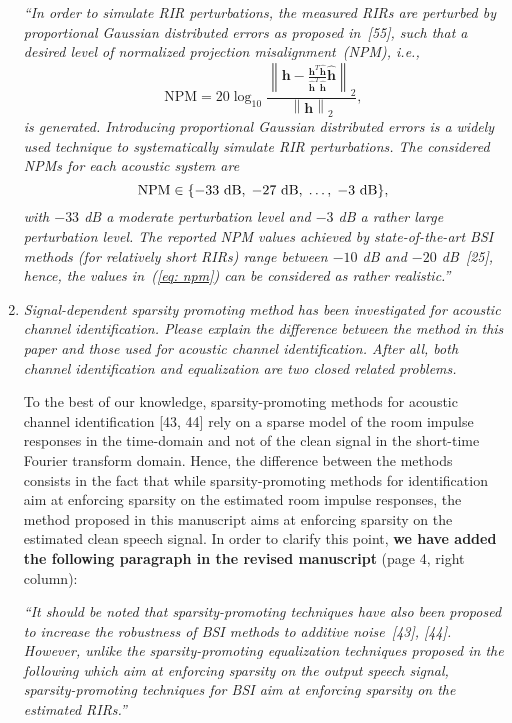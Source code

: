 \documentclass[9pt, a4paper]{article}
\begin{document}
\begin{enumerate}
{\textit{``In order to simulate RIR perturbations, the measured RIRs are perturbed by proportional Gaussian distributed errors as proposed in~[55], such that a desired level of normalized projection misalignment~(NPM), i.e.,
\begin{equation}
{\text{NPM}} = 20 \log_{10} \frac{ \left\| \mathbf{h} - \frac{\mathbf{h}^T\hat{\mathbf{h}}}{\hat{\mathbf{h}}^T\hat{\mathbf{h}}}\hat{\mathbf{h}}\right\|_2}{\left\| \mathbf{h} \right\|_2},
\end{equation}
is generated.
Introducing proportional Gaussian distributed errors is a widely used technique to systematically simulate RIR perturbations.
The considered NPMs for each acoustic system are
\begin{equation}
\label{eq: npm}
{\text{NPM}} \in \{ -33~{\rm dB}, \; -27~{\rm dB}, \; \ldots, \; -3~{\rm dB} \},
\end{equation}
with $-33$ dB a moderate perturbation level and $-3$ dB a rather large perturbation level.
The reported NPM values achieved by state-of-the-art BSI methods (for relatively short RIRs) range between $-10$ dB and $-20$ dB~[25], hence, the values in~(\ref{eq: npm}) can be considered as rather realistic.''
}}

\newpage

\item {\it{ Signal-dependent sparsity promoting method has been investigated for acoustic channel identification. Please explain the difference between the method in this paper and those used for acoustic channel identification. After all, both channel identification and equalization are two closed related problems.}}

  To the best of our knowledge, sparsity-promoting methods for acoustic channel identification [43, 44] rely on a sparse model of the room impulse responses in the time-domain and not of the clean signal in the short-time Fourier transform domain.
Hence, the difference between the methods consists in the fact that while sparsity-promoting methods for identification aim at enforcing sparsity on the estimated room impulse responses, the method proposed in this manuscript aims at enforcing sparsity on the estimated clean speech signal.
In order to clarify this point, {\bf{we have added the following paragraph in the revised manuscript}} (page 4, right column):

{\emph{``It should be noted that sparsity-promoting techniques have also been proposed to increase the robustness of BSI methods to additive noise~[43], [44].
        However, unlike the sparsity-promoting equalization techniques proposed in the following which aim at enforcing sparsity on the output speech signal, sparsity-promoting techniques for BSI aim at enforcing sparsity on the estimated RIRs.''}}


\end{enumerate}
\end{document}
